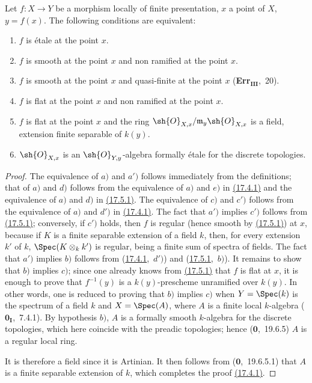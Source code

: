 \begin{theorem}[17.6.1]
\label{IV.17.6.1}
Let $f:X\to Y$ be a morphism locally of finite presentation, $x$ a point of $X$, $y=f(x)$.
The following conditions are equivalent:
\begin{enumerate}[label=(\alph*)]
  \item[a)] $f$ is \'etale at the point $x$.
  \item[a')] $f$ is smooth at the point $x$ and non ramified at the point $x$.
  \item[b)] $f$ is smooth at the point $x$ and quasi-finite at the point $x$ (\textbf{Err}$_\textbf{III}$,~20).
  \item[c)] $f$ is flat at the point $x$ and non ramified at the point $x$.
  \item[c')] $f$ is flat at the point $x$ and the ring $\sh{O}_{X,x}/\mathfrak{m}_y\sh{O}_{X,x}$ is a field, extension finite separable of $k(y)$.
  \item[d)] $\sh{O}_{X,x}$ is an $\sh{O}_{Y,y}$-algebra formally \'etale for the discrete topologies.
\end{enumerate}
\end{theorem}

\begin{proof}
The equivalence of $a)$ and $a')$ follows immediately from the definitions; that of $a)$ and $d)$ follows from the equivalence of $a)$ and $e)$ in {\hyperlink{ega4.c04.thm.17-4-1}{(17.4.1)}} and the equivalence of $a)$ and $d)$ in {\hyperlink{ega4.c04.thm.17-5-1}{(17.5.1)}}.
The equivalence of $c)$ and $c')$ follows from the equivalence of $a)$ and $d')$ in {\hyperlink{ega4.c04.thm.17-4-1}{(17.4.1)}}.
The fact that $a')$ implies $c')$ follows from {\hyperlink{ega4.c04.thm.17-5-1}{(17.5.1)}}; conversely, if $c')$ holds, then $f$ is regular (hence smooth by {\hyperlink{ega4.c04.thm.17-5-1}{(17.5.1)}}) at $x$, because if $K$ is a finite separable extension of a field $k$, then, for every extension $k'$ of $k$, $\Spec(K\otimes_k k')$ is regular, being a finite sum of spectra of fields.
The fact that $a')$ implies $b)$ follows from ({\hyperlink{ega4.c04.thm.17-4-1}{17.4.1}},~$d')$) and ({\hyperlink{ega4.c04.thm.17-5-1}{17.5.1}},~$b)$).
It remains to show that $b)$ implies $c)$; since one already knows from {\hyperlink{ega4.c04.thm.17-5-1}{(17.5.1)}} that $f$ is flat at $x$, it is enough to prove that $f^{-1}(y)$ is a $k(y)$-prescheme unramified over $k(y)$.
In other words, one is reduced to proving that $b)$ implies $c)$ when $Y=\Spec(k)$ is the spectrum of a field $k$ and $X=\Spec(A)$, where $A$ is a finite local $k$-algebra ($\mathbf{0}_\mathbf{I}$,~7.4.1).
By hypothesis $b)$, $A$ is a formally smooth $k$-algebra for the discrete topologies, which here coincide with the preadic topologies; hence ($\mathbf{0}$,~19.6.5) $A$ is a regular local ring.


It is therefore a field since it is Artinian.
It then follows from ($\mathbf{0}$,~19.6.5.1) that $A$ is a finite separable extension of $k$, which completes the proof {\hyperlink{ega4.c04.thm.17-4-1}{(17.4.1)}}.
\end{proof}

